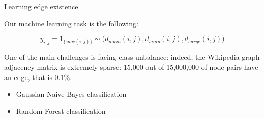 \documentclass[final]{beamer}
\newlength{\onecolwid}
\newlength{\twocolwid}
\begin{document}
\begin{frame}[t]
\begin{columns}[t]
\begin{column}{\twocolwid}
\begin{columns}[t,totalwidth=\twocolwid]
\end{columns} %






\begin{columns}[t,totalwidth=\twocolwid] %

\begin{column}{\onecolwid} %


\begin{block}{Learning edge existence}

Our machine learning task is the following:

$$y_{i, j} = 1_{\{edge(i, j)\}} \sim \big(d_{norm}(i, j), d_{simp}(i, j), d_{surge}(i, j)\big)$$

One of the main challenges is facing class unbalance: indeed, the Wikipedia graph adjacency matrix is extremely sparse: 15,000 out of 15,000,000 of node pairs have an edge, that is 0.1\%.

\begin{itemize}
  \item Gaussian Naive Bayes classification
  \item Random Forest classification
\end{itemize}

\end{block}



\end{column}
\end{columns}
\end{column}
\end{columns}
\end{frame}
\end{document}
